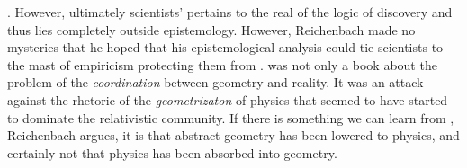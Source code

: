 \documentclass[draft]{article}
\newcommand{\PRZL}{\citetitle{Reichenbach1928}\xspace}
\begin{document}


. However, ultimately scientists'  pertains to the real of the logic of discovery and thus lies completely outside epistemology. However, Reichenbach made no mysteries that he hoped that his epistemological analysis could tie scientists to the mast of empiricism protecting them from  \citep[373]{Reichenbach1928}. \PRZL was not only a book about the problem of the \emph{coordination} between geometry and reality. It was an attack against the rhetoric of the \emph{geometrizaton} of physics that seemed to have started to dominate the relativistic community. If there is something we can learn from \gr, Reichenbach argues, it is that abstract geometry has been lowered to physics, and certainly not that physics has been absorbed into geometry. 
\end{document}
